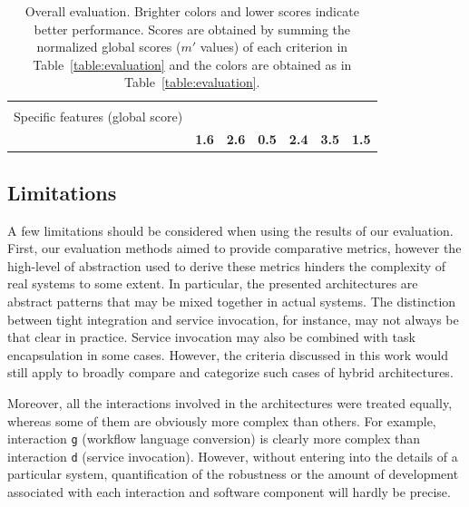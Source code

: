 \documentclass[preprint,3p,twocolumn]{elsarticle}
\begin{document}
\begin{table}
\begin{tabular}{rcccccc}
                                     & \cellcolor[HTML]{99CC99}{0.50}
                                     & \cellcolor[HTML]{99CC99}{0.50}\\
Specific features (global score) & \cellcolor[HTML]{99FF99}{0.00}
                                     & \cellcolor[HTML]{999999}{1.00}
                                     & \cellcolor[HTML]{99FF99}{0.00}
                                     & \cellcolor[HTML]{999999}{1.00}
                                     & \cellcolor[HTML]{99FF99}{0.00}
                                     & \cellcolor[HTML]{99FF99}{0.00}\\
                                    & \cellcolor[HTML]{99DA99}\textbf{1.6}
                                    & \cellcolor[HTML]{99B899}\textbf{2.6}
                                    & \cellcolor[HTML]{99FF99}\textbf{0.5}
                                    & \cellcolor[HTML]{99BF99}\textbf{2.4}
                                    & \cellcolor[HTML]{999999}\textbf{3.5}
                                    & \cellcolor[HTML]{99DE99}\textbf{1.5}\\
\end{tabular}
\caption{Overall evaluation. Brighter colors and lower scores indicate better performance. Scores
  are obtained by summing the normalized global scores ($m'$ values) of
  each criterion in Table~\ref{table:evaluation} and the colors are obtained as in Table~\ref{table:evaluation}. }
\label{table:overall}
\end{table}

\subsection{Limitations}


A few limitations should be considered when using the results of our
evaluation. First, our evaluation methods aimed to provide comparative
metrics, however the high-level of abstraction used to derive these
metrics hinders the complexity of real systems to some
extent. In particular, the
presented architectures are abstract patterns that may be mixed
together in actual systems. The distinction between tight integration and
service invocation, for instance, may not always be that clear in
practice. Service invocation may also be combined with task
encapsulation in some cases. However, the criteria discussed in this
work would still apply to broadly compare and categorize such cases of
hybrid architectures.

Moreover, all the interactions involved in the architectures were
treated equally, whereas some of them are obviously more complex than
others. For example, interaction \texttt{g} (workflow language
conversion) is clearly more complex than interaction \texttt{d}
(service invocation). However, without entering into the details of a particular
system, quantification of the robustness or the amount of development
associated with each interaction and software component will hardly be
precise.
\end{document}
